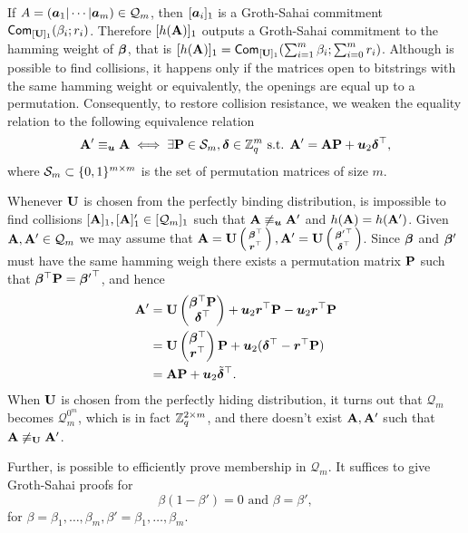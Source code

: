 If $A=({\boldsymbol{a}}_1|\cdots|{\boldsymbol{a}}_m)\in\mathcal{Q}_m$, then $[{\boldsymbol{a}}_i]_1$ is a Groth-Sahai commitment $\mathsf{Com}_{[\mathbf{{U}}]_1}(\beta_i;r_i)$.
Therefore $[h(\mathbf{{A}})]_1$ outputs a Groth-Sahai commitment to the hamming weight of ${\boldsymbol{\beta}}$, that is $[h(\mathbf{{A}})]_1 = \mathsf{Com}_{[\mathbf{{U}}]_1}(\sum_{i=1}^m \beta_i;\sum_{i=0}^m r_i)$. Although is possible to find collisions, it happens only if the matrices open to bitstrings with the same hamming weight or equivalently, the openings are equal up to a permutation. Consequently, to restore collision resistance, we weaken the equality relation to the following equivalence relation
$$
\mathbf{{A}}' \equiv_{\boldsymbol{u}} \mathbf{{A}} \iff \exists \mathbf{{P}}\in\mathcal{S}_m, {\boldsymbol{\delta}}\in\mathbb{Z}_q^m \text{ s.t. } \mathbf{{A}}' = \mathbf{{A}}\mathbf{{P}} + {\boldsymbol{u}}_2{\boldsymbol{\delta}}^\top,
$$
where $\mathcal{S}_m\subset \{0,1\}^{m\times m}$ is the set of permutation matrices of size $m$.

Whenever $\mathbf{{U}}$ is chosen from the perfectly binding distribution, is impossible to find collisions $[\mathbf{{A}}]_1,[\mathbf{{A}}]_1'\in[\mathcal{Q}_m]_1$ such that $\mathbf{{A}}\not\equiv_{\boldsymbol{u}}\mathbf{{A}}'$ and $h(\mathbf{{A}})=h(\mathbf{{A}}')$. Given $\mathbf{{A}},\mathbf{{A}}'\in\mathcal{Q}_m$ we may assume that $\mathbf{{A}}=\mathbf{{U}}\left(\begin{smallmatrix}{\boldsymbol{\beta}}^\top\\{\boldsymbol{r}}^\top\end{smallmatrix}\right),\mathbf{{A}}'=\mathbf{{U}}\left(\begin{smallmatrix}{{\boldsymbol{\beta}}'}^\top\\{\boldsymbol{\delta}}^\top\end{smallmatrix}\right)$. Since ${\boldsymbol{\beta}}$ and ${\boldsymbol{\beta}}'$ must have the same hamming weigh there exists a permutation matrix $\mathbf{{P}}$ such that ${\boldsymbol{\beta}}^\top\mathbf{{P}} = {{\boldsymbol{\beta}}'}^\top$, and hence
\begin{align*}
\mathbf{{A}}' &= \mathbf{{U}}\left(\begin{matrix}{\boldsymbol{\beta}}^\top\mathbf{{P}}\\{\boldsymbol{\delta}}^\top\end{matrix}\right)+ {\boldsymbol{u}}_2{\boldsymbol{r}}^\top\mathbf{{P}} - {\boldsymbol{u}}_2{\boldsymbol{r}}^\top\mathbf{{P}}\\
&=
\mathbf{{U}} \left(\begin{matrix}{\boldsymbol{\beta}}^\top\\{\boldsymbol{r}}^\top\end{matrix}\right)\mathbf{{P}} + {\boldsymbol{u}}_2({\boldsymbol{\delta}}^\top-{\boldsymbol{r}}^\top\mathbf{{P}})\\
 &=
 \mathbf{{A}}\mathbf{{P}} + {\boldsymbol{u}}_2\tilde{{\boldsymbol{\delta}}}^\top.
\end{align*}
When $\mathbf{{U}}$ is chosen from the perfectly hiding distribution, it turns out that $\mathcal{Q}_m$ becomes $\mathcal{Q}_m^{0^m}$, which is in fact $\mathbb{Z}_q^{2\times m}$, and there doesn't exist $\mathbf{{A}},\mathbf{{A}}'$ such that $\mathbf{{A}}\not\equiv_{\mathbf{{U}}}\mathbf{{A}}'$. 

Further, is possible to efficiently prove membership in $\mathcal{Q}_m$. It suffices to give Groth-Sahai proofs for
\begin{equation}
\beta(1-\beta')=0\text{ and }\beta=\beta' \label{eq:Qm-memb},
\end{equation}
for $\beta=\beta_1,\ldots,\beta_m,\beta'=\beta_1,\ldots,\beta_m$.

